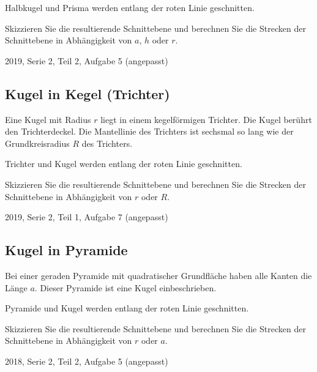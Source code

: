 Halbkugel und Prisma werden entlang der roten Linie geschnitten.

Skizzieren Sie die resultierende Schnittebene und berechnen Sie
die Strecken der Schnittebene in Abhängigkeit von $a$, $h$ oder $r$.

{\tiny{2019, Serie 2, Teil 2, Aufgabe 5 (angepasst)}}


\subsection{Kugel in Kegel (Trichter)}

Eine Kugel mit Radius $r$ liegt in einem kegelförmigen Trichter.
Die Kugel berührt den Trichterdeckel. Die Mantellinie des Trichters
ist sechsmal so lang wie der Grundkreisradius $R$ des Trichters.

Trichter und Kugel werden entlang der roten Linie geschnitten.

Skizzieren Sie die resultierende Schnittebene und berechnen
Sie die Strecken der Schnittebene in Abhängigkeit von $r$ oder $R$.

{\tiny{2019, Serie 2, Teil 1, Aufgabe 7 (angepasst)}}


\subsection{Kugel in Pyramide}
Bei einer geraden Pyramide mit quadratischer Grundfläche haben alle
Kanten die Länge $a$. Dieser Pyramide ist eine Kugel einbeschrieben.

Pyramide und Kugel werden entlang der roten Linie geschnitten.

Skizzieren Sie die resultierende Schnittebene und berechnen
Sie die Strecken der Schnittebene in Abhängigkeit von $r$ oder $a$.

{\tiny{2018, Serie 2, Teil 2, Aufgabe 5 (angepasst)}}




